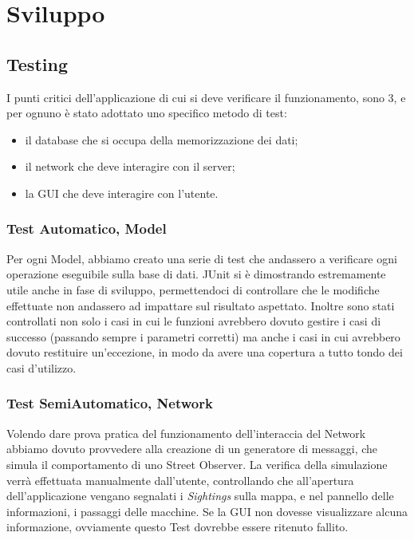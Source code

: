 \documentclass[a4paper,12pt]{report}
\begin{document}
\chapter{Sviluppo}

\section{Testing}

  I punti critici dell'applicazione di cui si deve verificare il funzionamento, 
  sono 3, e per ognuno è stato adottato uno specifico metodo di test: 
  \begin{itemize}
    \item il database che si occupa della memorizzazione dei dati;
    \item il network che deve interagire con il server;
    \item la GUI che deve interagire con l'utente.
  \end{itemize}


  \subsection{Test Automatico, Model}

    Per ogni Model, abbiamo creato una serie di test che andassero a verificare 
    ogni operazione eseguibile sulla base di dati.\newline
    JUnit si è dimostrando estremamente utile anche in fase di sviluppo, 
    permettendoci di controllare che le modifiche effettuate non andassero ad 
    impattare sul risultato aspettato. Inoltre sono stati controllati non solo 
i casi in cui le funzioni avrebbero dovuto gestire i casi di successo 
(passando sempre i parametri corretti) ma anche i casi in cui 
avrebbero dovuto restituire un'eccezione, in modo da avere una copertura a 
tutto tondo dei casi d'utilizzo.


  \subsection{Test SemiAutomatico, Network}
    Volendo dare prova pratica del funzionamento dell'interaccia del Network 
    abbiamo dovuto provvedere alla creazione di un generatore di messaggi, che 
    simula il comportamento di uno Street Observer.\newline
    La verifica della simulazione verrà effettuata manualmente dall'utente, 
    controllando che all'apertura dell'applicazione vengano segnalati i 
    \textit{Sightings} sulla mappa, e nel pannello delle informazioni, i 
passaggi delle macchine. Se la GUI non dovesse visualizzare alcuna informazione, 
ovviamente questo Test dovrebbe essere ritenuto fallito.
\end{document}
